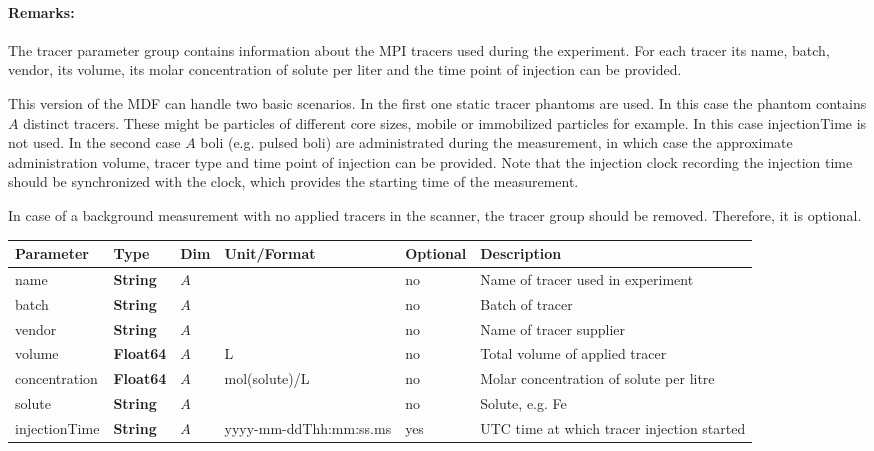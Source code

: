 \documentclass[landscape,a4paper]{article} %
\newcommand{\inltab}[1]{{\ttfamily\bfseries\color{blue}#1}}
\newcommand{\inlvar}[1]{{\ttfamily#1}}
\begin{document}
\begin{multicols}{2}
\paragraph{Remarks:} The tracer parameter group contains information about the MPI tracers used during the experiment. For each tracer its \inlvar{name}, \inlvar{batch}, \inlvar{vendor}, its \inlvar{volume}, its molar \inlvar{concentration} of \inlvar{solute} per liter and the time point of injection can be provided.

This version of the MDF can handle two basic scenarios. In the first one static tracer phantoms are used. In this case the phantom contains $A$ distinct tracers. These might be particles of different core sizes, mobile or immobilized particles for example. In this case \inlvar{injectionTime} is not used. In the second case $A$ boli (e.g. pulsed boli) are administrated during the measurement, in which case the approximate administration volume, tracer type and time point of injection can be provided. Note that the injection clock recording the injection time should be synchronized with the clock, which provides the starting time of the measurement.

In case of a background measurement with no applied tracers in the scanner, the tracer group should be removed. Therefore, it is optional.
\end{multicols}

\noindent \begin{tabularx}{\columnwidth}{lllllX} 
\textbf{Parameter} & \textbf{Type} & \textbf{Dim} & \textbf{Unit/Format} & \textbf{Optional} & \textbf{Description} \\ \hline 
\inlvar{name} & \inltab{String} & $A$ & & no & Name of tracer used in experiment \\ \hline
\inlvar{batch} & \inltab{String} & $A$ & & no & Batch of tracer \\ \hline
\inlvar{vendor} & \inltab{String} & $A$ & & no & Name of tracer supplier \\ \hline
\inlvar{volume} & \inltab{Float64} & $A$ & L & no & Total volume of applied tracer \\ \hline
\inlvar{concentration} & \inltab{Float64} & $A$ & mol(solute)/L & no & Molar concentration of solute per litre \\ \hline
\inlvar{solute} & \inltab{String} & $A$ & & no & Solute, e.g. Fe \\ \hline
\inlvar{injectionTime} & \inltab{String} & $A$ & yyyy-mm-ddThh:mm:ss.ms & yes & UTC time at which tracer injection started \\ \hline
\end{tabularx}
\end{document}
